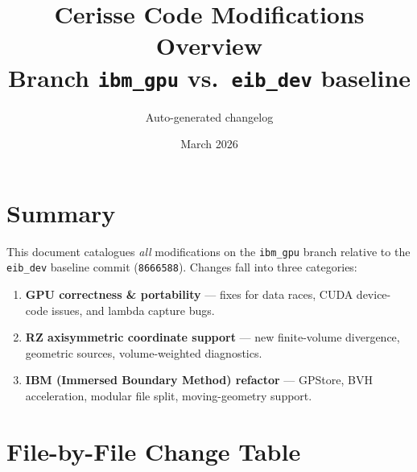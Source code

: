 \documentclass[11pt,a4paper]{article}
\title{\textbf{Cerisse Code Modifications Overview}\\[4pt]
       \large Branch \texttt{ibm\_gpu} vs.\ \texttt{eib\_dev} baseline}
\author{Auto-generated changelog}
\date{March 2026}
\begin{document}
\maketitle

\section{Summary}

This document catalogues \emph{all} modifications on the \texttt{ibm\_gpu}
branch relative to the \texttt{eib\_dev} baseline commit
(\texttt{8666588}).  Changes fall into three categories:

\begin{enumerate}[leftmargin=2em]
  \item \textbf{GPU correctness \& portability} --- fixes for data races,
        CUDA device-code issues, and lambda capture bugs.
  \item \textbf{RZ axisymmetric coordinate support} --- new finite-volume
        divergence, geometric sources, volume-weighted diagnostics.
  \item \textbf{IBM (Immersed Boundary Method) refactor} --- GPStore,
        BVH acceleration, modular file split, moving-geometry support.
\end{enumerate}

\section{File-by-File Change Table}
\end{document}
